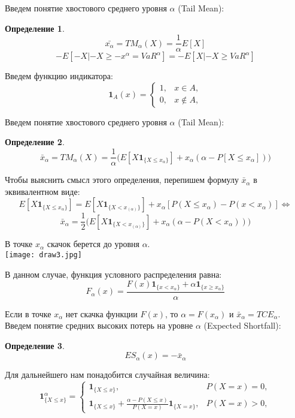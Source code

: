 \documentclass[18pt,a4paper]{article}
\theoremstyle{plain}
\theoremstyle{definition}
\newtheorem{Def}{Определение}[section]
\begin{document}
Введем понятие хвостового среднего уровня $\alpha$ (Tail Mean):

\begin{Def} \label{main}
$$
\bar{x_{\alpha}} = TM_{\alpha}(X) = \frac{1}{\alpha}E[X]
$$
$$
-E[-X| -X \ge -x^{\alpha}=VaR^{\alpha}] = -E[X| -X \ge VaR^{\alpha}]
$$
\end{Def}


Введем функцию индикатора:
$$
\mathbf{1}_A(x) =
\left\{\begin{matrix}
1, &x \in A, \\
0, &x \notin A,
\end{matrix}\right.
$$


Введем понятие хвостового среднего уровня $\alpha$ (Tail Mean):

\begin{Def} \label{main}
$$
\bar{x}_{\alpha} = TM_{\alpha}(X) = \frac{1}{\alpha}\Big(E[X\mathbf{1}_{\{X\le x_\alpha\}}] +x_\alpha(\alpha-P[X\le x_\alpha])\Big)
$$
\end{Def}
Чтобы выяснить смысл этого определения, перепишем формулу $\bar{x}_{\alpha}$ в эквивалентном виде:\\
$$
E[X\mathbf{1}_{\{X\le x_\alpha\}}] = E[X\mathbf{1}_{\{X < x_{(\alpha)}\}}] + x_\alpha[P(X \le x_\alpha) - P(x <x_\alpha)] \Leftrightarrow
$$
$$
\bar{x}_{\alpha}  = \frac{1}{2} \Bigg( E[X\mathbf{1}_{\{X < x_{(\alpha)}\} }] + x_\alpha (\alpha - P(X<x_\alpha)) \Bigg)
$$


В точке $x_{\alpha}$ скачок берется до уровня $\alpha$.\\
\center
\texttt{[image: draw3.jpg]}
\flushleft

В данном случае, функция условного распределения равна:\\
$$
F_\alpha(x) = \frac{F(x)\mathbf{1}_{\{x<x_\alpha\}} + \alpha\mathbf{1}_{\{x\ge x_\alpha\}}   }{\alpha}
$$


Если в точке $x_{\alpha}$ нет скачка функции $F(x)$, то $\alpha = F(x_{\alpha})$ и $\bar{x}_{\alpha} = TCE_\alpha$.\\
Введем понятие средних высоких потерь на уровне $\alpha$ (Expected Shortfall):
\begin{Def} \label{main}
$$
ES_\alpha(x) = - \bar{x}_{\alpha}
$$
\end{Def}

Для дальнейшего нам понадобится случайная величина:\\
$$
\mathbf{1}^\alpha_{\{X \le x\}} =
\left\{\begin{matrix}
\mathbf{1}_{\{X \le x\}}, &P(X=x)=0, \\
\mathbf{1}_{\{X \le x\}} + \frac{\alpha-P(X \le x)}{P(X=x)}\mathbf{1}_{\{X = x\}}, &P(X=x)>0,
\end{matrix}\right.
$$
\end{document}
